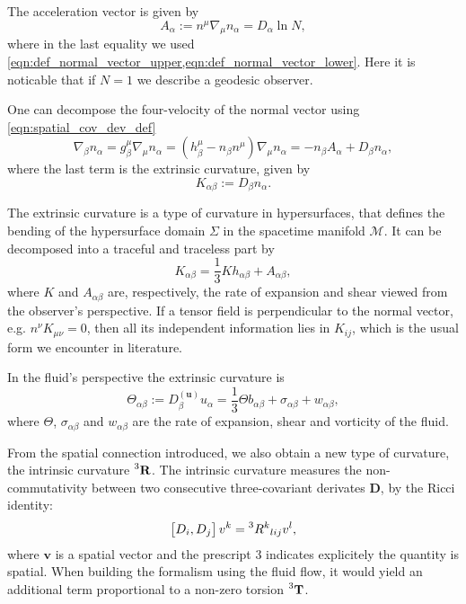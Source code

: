 The acceleration vector is given by
\begin{equation}
    A_\alpha:=n^\mu \nabla_\mu n_\alpha=D_\alpha\ln N,
    \label{eqn:acceleration_normal}
\end{equation}
where in the last equality we used \cref{eqn:def_normal_vector_upper,eqn:def_normal_vector_lower}. 
Here it is noticable that if $N=1$ we describe a geodesic observer.

One can decompose the four-velocity of the normal vector using \cref{eqn:spatial_cov_dev_def}
\begin{equation}
    \nabla_\beta n_\alpha = g_\beta^\mu \nabla_\mu n_\alpha = (h_\beta^\mu-n_\beta n^\mu)\nabla_\mu n_\alpha=-n_\beta A_\alpha + D_\beta n_\alpha,
\end{equation}
where the last term is the extrinsic curvature, given by
\begin{equation}
    K_{\alpha\beta}:=D_\beta n_\alpha. 
\end{equation}

The extrinsic curvature is a type of curvature in hypersurfaces, that defines the bending of the hypersurface domain $\Sigma$ in the spacetime manifold $\mathcal{M}$.
It can be decomposed into a traceful and traceless part by
\begin{equation}
    K_{\alpha\beta}=\frac{1}{3}Kh_{\alpha\beta}+A_{\alpha\beta},
\end{equation}
where $K$ and $A_{\alpha\beta}$ are, respectively, the rate of expansion and shear viewed from the observer's perspective.
If a tensor field is perpendicular to the normal vector, e.g. $n^\nu K_{\mu\nu}=0$, then all its independent information lies in $K_{ij}$, which is the usual form we encounter in literature.


In the fluid's perspective the extrinsic curvature is
\begin{equation}
    \Theta_{\alpha\beta}:=D^{(\mathbf{u})}_\beta u_\alpha=\frac{1}{3}\Theta b_{\alpha\beta} + \sigma_{\alpha\beta} + w_{\alpha\beta},
\end{equation}
where $\Theta$, $\sigma_{\alpha\beta}$ and $w_{\alpha\beta}$ are the rate of expansion, shear and vorticity of the fluid.

From the spatial connection introduced, we also obtain a new type of curvature, the intrinsic curvature $\prescript{3}{}{\mathbf{R}}$.
The intrinsic curvature measures the non-commutativity between two consecutive three-covariant derivates $\mathbf{D}$, by the Ricci identity:
\begin{equation}
    \left[D_i,D_j\right]v^k=\prescript{3}{}R^{k}{}_{lij}v^l,
    \label{eqn:spatial_ricci_identity}
\end{equation}
where $\mathbf{v}$ is a spatial vector and the prescript 3 indicates explicitely the quantity is spatial. 
When building the formalism using the fluid flow, it would yield an additional term proportional to a non-zero torsion $\prescript{3}{}{\mathbf{T}}$.%


